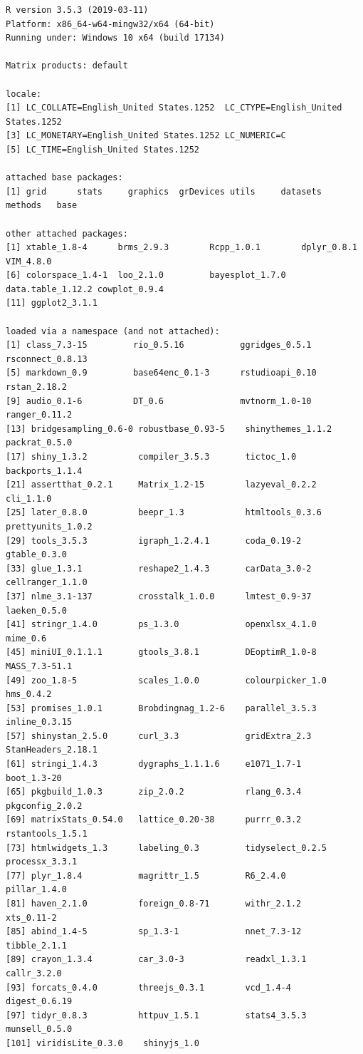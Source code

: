 \documentclass[11pt,twoside]{article}
\numberwithin{Theorem}{section}
\numberwithin{Definition}{section}
\numberwithin{Lemma}{section}
\numberwithin{Algorithm}{section}
\numberwithin{equation}{section}
\begin{document}
\begin{verbatim}
R version 3.5.3 (2019-03-11)
Platform: x86_64-w64-mingw32/x64 (64-bit)
Running under: Windows 10 x64 (build 17134)

Matrix products: default

locale:
[1] LC_COLLATE=English_United States.1252  LC_CTYPE=English_United States.1252   
[3] LC_MONETARY=English_United States.1252 LC_NUMERIC=C                          
[5] LC_TIME=English_United States.1252    

attached base packages:
[1] grid      stats     graphics  grDevices utils     datasets  methods   base     

other attached packages:
[1] xtable_1.8-4      brms_2.9.3        Rcpp_1.0.1        dplyr_0.8.1       VIM_4.8.0        
[6] colorspace_1.4-1  loo_2.1.0         bayesplot_1.7.0   data.table_1.12.2 cowplot_0.9.4    
[11] ggplot2_3.1.1    

loaded via a namespace (and not attached):
[1] class_7.3-15         rio_0.5.16           ggridges_0.5.1       rsconnect_0.8.13    
[5] markdown_0.9         base64enc_0.1-3      rstudioapi_0.10      rstan_2.18.2        
[9] audio_0.1-6          DT_0.6               mvtnorm_1.0-10       ranger_0.11.2       
[13] bridgesampling_0.6-0 robustbase_0.93-5    shinythemes_1.1.2    packrat_0.5.0       
[17] shiny_1.3.2          compiler_3.5.3       tictoc_1.0           backports_1.1.4     
[21] assertthat_0.2.1     Matrix_1.2-15        lazyeval_0.2.2       cli_1.1.0           
[25] later_0.8.0          beepr_1.3            htmltools_0.3.6      prettyunits_1.0.2   
[29] tools_3.5.3          igraph_1.2.4.1       coda_0.19-2          gtable_0.3.0        
[33] glue_1.3.1           reshape2_1.4.3       carData_3.0-2        cellranger_1.1.0    
[37] nlme_3.1-137         crosstalk_1.0.0      lmtest_0.9-37        laeken_0.5.0        
[41] stringr_1.4.0        ps_1.3.0             openxlsx_4.1.0       mime_0.6            
[45] miniUI_0.1.1.1       gtools_3.8.1         DEoptimR_1.0-8       MASS_7.3-51.1       
[49] zoo_1.8-5            scales_1.0.0         colourpicker_1.0     hms_0.4.2           
[53] promises_1.0.1       Brobdingnag_1.2-6    parallel_3.5.3       inline_0.3.15       
[57] shinystan_2.5.0      curl_3.3             gridExtra_2.3        StanHeaders_2.18.1  
[61] stringi_1.4.3        dygraphs_1.1.1.6     e1071_1.7-1          boot_1.3-20         
[65] pkgbuild_1.0.3       zip_2.0.2            rlang_0.3.4          pkgconfig_2.0.2     
[69] matrixStats_0.54.0   lattice_0.20-38      purrr_0.3.2          rstantools_1.5.1    
[73] htmlwidgets_1.3      labeling_0.3         tidyselect_0.2.5     processx_3.3.1      
[77] plyr_1.8.4           magrittr_1.5         R6_2.4.0             pillar_1.4.0        
[81] haven_2.1.0          foreign_0.8-71       withr_2.1.2          xts_0.11-2          
[85] abind_1.4-5          sp_1.3-1             nnet_7.3-12          tibble_2.1.1        
[89] crayon_1.3.4         car_3.0-3            readxl_1.3.1         callr_3.2.0         
[93] forcats_0.4.0        threejs_0.3.1        vcd_1.4-4            digest_0.6.19       
[97] tidyr_0.8.3          httpuv_1.5.1         stats4_3.5.3         munsell_0.5.0       
[101] viridisLite_0.3.0    shinyjs_1.0  
\end{verbatim}
\end{document}
